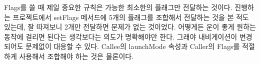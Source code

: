 Flags를 쓸 때 제일 중요한 규칙은 가능한 최소한의 플래그만 전달하는 것이다.
진행하는 프로젝트에서 setFlags 메서드에 5개의 플래그를 조합해서 전달하는 것을 본 적도 있는데, 잘 따져보니 2개만 전달하면 문제가 없는 것이었다.
어떻게든 운이 좋게 원하는 동작에 걸리면 된다는 생각보다는 의도가 명확해야만 한다. 그래야 내비게이션이 변경되어도 문제없이 대응할 수 있다. Callee의 launchMode 속성과 Caller의 Flags를 적절하게 사용해서 조합해야 하는 것은 물론이다. 

